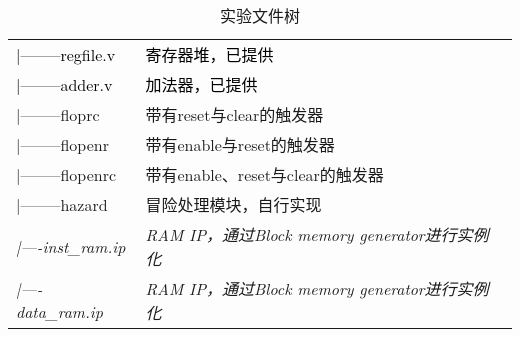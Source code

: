 \begin{table}[htbp]
\begin{tabu}{|l|l|}
        \textcolor{black}{|--------regfile.v} & \textcolor{black}{寄存器堆，已提供} \\
        \textcolor{black}{|--------adder.v} & \textcolor{black}{加法器，已提供} \\
        \rowfont{\color{black}}
        |--------floprc & 带有reset与clear的触发器 \\
        \rowfont{\color{black}}
	    |--------flopenr & 带有enable与reset的触发器 \\
	    \rowfont{\color{black}}
	    |--------flopenrc & 带有enable、reset与clear的触发器 \\
	    \rowfont{\color{red}}
        |--------hazard & 冒险处理模块，自行实现 \\
        \textit{|----inst\_ram.ip} & \textit{RAM IP，通过Block memory generator进行实例化}\\
        \textit{|----data\_ram.ip} & \textit{RAM IP，通过Block memory generator进行实例化}\\
        \hline
    \end{tabu}
    \caption{实验文件树}
    \label{tab:file_tree}
\end{table}